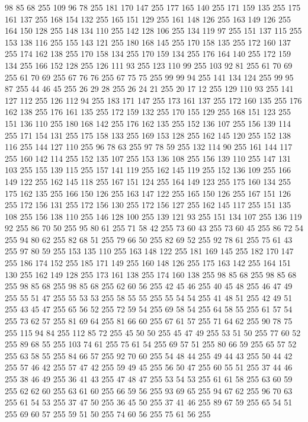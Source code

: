 98 85 68 255 109 96 78 255 181 170 147 255 177 165 140 255 171 159 135 255 175 161 137 255 168 154 132 255 165 151 129 255 161 148 126 255 163 149 126 255 164 150 128 255 148 134 110 255 142 128 106 255 134 119 97 255 151 137 115 255 153 138 116 255 155 143 121 255 180 168 145 255 170 158 135 255 172 160 137 255 174 162 138 255 170 158 134 255 170 159 134 255 176 164 140 255 172 159 134 255 166 152 128 255 126 111 93 255 123 110 99 255 103 92 81 255 61 70 69 255 61 70 69 255 67 76 76 255 67 75 75 255 99 99 94 255 141 134 124 255 99 95 87 255 44 46 45 255 26 29 28 255 26 24 21 255 20 17 12 255 129 110 93 255 141 127 112 255 126 112 94 255 183 171 147 255 173 161 137 255 172 160 135 255 176 162 138 255 176 161 135 255 172 159 132 255 170 155 129 255 168 151 123 255 151 136 110 255 180 168 142 255 176 162 135 255 152 136 107 255 156 139 114 255 171 154 131 255 175 158 133 255 169 153 128 255 162 145 120 255 152 138 116 255 144 127 110 255 96 78 63 255 97 78 59 255
132 114 90 255 161 144 117 255 160 142 114 255 152 135 107 255 153 136 108 255 156 139 110 255 147 131 103 255 155 139 115 255 157 141 119 255 162 145 119 255 152 136 109 255 166 149 122 255 162 145 118 255 167 151 124 255 164 149 123 255 175 160 134 255 175 162 135 255 166 150 126 255 163 147 122 255 165 150 126 255 167 151 126 255 172 156 131 255 172 156 130 255 172 156 127 255 162 145 117 255 151 135 108 255 156 138 110 255 146 128 100 255 139 121 93 255 151 134 107 255 136 119 92 255 86 70 50 255 95 80 61 255 71 58 42 255 73 60 43 255 73 60 45 255 86 72 54 255 94 80 62 255 82 68 51 255 79 66 50 255 82 69 52 255 92 78 61 255 75 61 43 255 97 80 59 255 153 135 110 255 163 148 122 255 181 169 145 255 182 170 147 255 186 174 152 255 185 171 149 255 160 148 126 255 175 163 142 255 164 151 130 255 162 149 128 255 173 161 138 255 174 160 138 255 98 85 68 255 98 85 68 255 98 85 68 255 98 85 68 255 62 60 56 255 42 45 46 255 40 45 48 255 46 47 49 255
55 51 47 255 55 53 53 255 58 55 55 255 55 54 54 255 41 48 51 255 42 49 51 255 43 45 47 255 65 56 52 255 72 59 54 255 69 58 54 255 64 58 55 255 61 57 54 255 73 62 57 255 81 69 64 255 81 66 60 255 67 61 57 255 71 64 62 255 90 78 75 255 115 94 84 255 112 85 72 255 45 50 50 255 45 47 49 255 53 51 50 255 77 60 52 255 89 68 55 255 103 74 61 255 75 61 54 255 69 57 51 255 80 66 59 255 65 57 52 255 63 58 55 255 84 66 57 255 92 70 60 255 54 48 44 255 49 44 43 255 50 44 42 255 57 46 42 255 57 47 42 255 59 49 45 255 56 50 47 255 60 55 51 255 37 44 46 255 38 46 49 255 36 41 43 255 47 48 47 255 53 54 53 255 61 61 58 255 63 60 59 255 62 62 60 255 63 61 60 255 66 59 56 255 93 69 65 255 94 67 62 255 96 70 63 255 61 54 53 255 37 47 50 255 36 45 50 255 37 41 46 255 89 67 59 255 65 54 51 255 69 60 57 255 59 51 50 255 74 60 56 255 75 61 56 255
